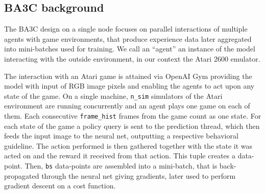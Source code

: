 \documentclass{llncs}
\begin{document}
\subsection{BA3C background} \label{subsection_ba3c_background}
The BA3C design on a single node focuses on parallel interactions of multiple agents with game environments, that produce experience data later aggregated into mini-batches used for training. We call an ``agent'' an instance of the model interacting with the outside environment, in our context the Atari 2600 emulator.

The interaction with an Atari game is attained via OpenAI Gym \cite{openai_gym} providing the model with input of RGB image pixels and enabling the agents to act upon any state of the game. On a single machine, \texttt{n\_sim} simulators of the Atari environment are running concurrently and an agent plays one game on each of them. Each consecutive \texttt{frame\_hist} frames from the game count as one state. For each state of the game a policy query is sent to the prediction thread, which then feeds the input image to the neural net, outputting a respective behavioral guideline. The action performed is then gathered together with the state it was acted on and the reward it received from that action. This tuple creates a data-point.
Then, \texttt{bs} data-points are assembled into a mini-batch, that is back-propagated through the neural net giving gradients, later used to perform gradient descent on a cost function.
\end{document}
